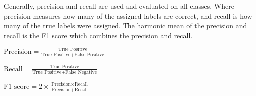 Generally, precision and recall are used and evaluated on all
classes. Where precision measures how many of
the assigned labels are correct, and recall is how many of the true
labels were assigned.
The harmonic mean of the precision and recall is the F1 score which
combines the precision and recall.

\begin{definition}[Precision]
  $\text{Precision} = \frac{\text{True Positive}}{\text{True
  Positive} + \text{False Positive}}$
\end{definition}

\begin{definition}[Recall]
  $\text{Recall} = \frac{\text{True Positive}}{\text{True Positive} +
  \text{False Negative}}$
\end{definition}

\begin{definition}[F1-score]
  $\text{F1-score} = 2 \times \frac{\text{Precision} \times
  \text{Recall}}{\text{Precision} + \text{Recall}}$
\end{definition}

